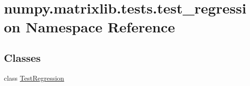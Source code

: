 \hypertarget{namespacenumpy_1_1matrixlib_1_1tests_1_1test__regression}{}\section{numpy.\+matrixlib.\+tests.\+test\+\_\+regression Namespace Reference}
\label{namespacenumpy_1_1matrixlib_1_1tests_1_1test__regression}
\subsection*{Classes}
\begin{DoxyCompactItemize}
\item 
class \hyperlink{classnumpy_1_1matrixlib_1_1tests_1_1test__regression_1_1TestRegression}{Test\+Regression}
\end{DoxyCompactItemize}
